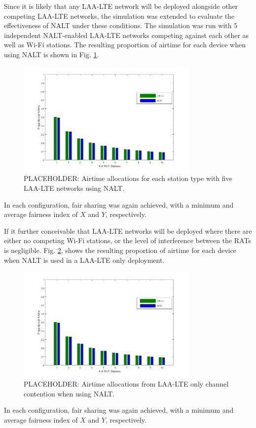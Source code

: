 Since it is likely that any LAA-LTE network will be deployed alongside other competing LAA-LTE networks, the simulation was extended to evaluate the effectiveness of NALT under these conditions.  The simulation was run with 5 independent NALT-enabled LAA-LTE networks competing against each other as well as Wi-Fi stations.  The resulting proportion of airtime for each device when using NALT is shown in Fig. \ref{multi-results}.
\begin{figure}[!ht]
	\centering
	\includegraphics[width=3.5in]{figures3/withadapt}
	\caption{PLACEHOLDER: Airtime allocations for each station type with five LAA-LTE networks using NALT.}
	\label{multi-results}
\end{figure}
In each configuration, fair sharing was again achieved, with a minimum and average fairness index of $X$ and $Y$, respectively. 

If it further conceivable that LAA-LTE networks will be deployed where there are either no competing Wi-Fi stations, or the level of interference between the RATs is negligible.  Fig. \ref{NALT-only-results}, shows the resulting proportion of airtime for each device when NALT is used in a LAA-LTE only deployment. 
\begin{figure}[!ht]
	\centering
	\includegraphics[width=3.5in]{figures3/withadapt}
	\caption{PLACEHOLDER: Airtime allocations from LAA-LTE only channel contention when using NALT.}
	\label{NALT-only-results}
\end{figure}
In each configuration, fair sharing was again achieved, with a minimum and average fairness index of $X$ and $Y$, respectively. 

